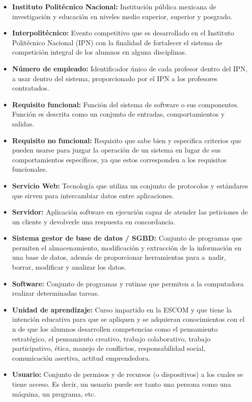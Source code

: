 \begin{itemize}
		\item \textbf{Instituto Politécnico Nacional:} Institución pública mexicana de investigación y educación en niveles medio superior, superior y posgrado. 
		\item \textbf{Interpolitécnico:} Evento competitivo que es desarrollado en el Instituto Politécnico Nacional (IPN) con la finalidad de fortalecer el sistema de competición integral de los alumnos en alguna disciplinas.
		\item \textbf{Número de empleado:} Identificador único de cada profesor dentro del IPN, a usar dentro del sistema, proporcionado por el IPN a los profesores contratados. 
		\item \textbf{Requisito funcional:} Función del sistema de software o sus componentes. Función es descrita como un conjunto de entradas, comportamientos y salidas. 
		\item \textbf{Requisito no funcional:} Requisito que sabe bien y especifica criterios que pueden usarse para juzgar la operación de un sistema en lugar de sus comportamientos específicos, ya que estos corresponden a los requisitos funcionales. 
		\item \textbf{Servicio Web:} Tecnología que utiliza un conjunto de protocolos y estándares que sirven para intercambiar datos entre aplicaciones.
		\item \textbf{Servidor:} Aplicación software en ejecución capaz de atender las peticiones de un cliente y devolverle una respuesta en concordancia.
		\item \textbf{Sistema gestor de base de datos / SGBD:} Conjunto de programas que permiten el almacenamiento, modificación y extracción de la información en una base de datos, además de proporcionar herramientas para a~nadir, borrar, modificar y analizar los datos.
		\item \textbf{Software:} Conjunto de programas y rutinas que permiten a la computadora realizar determinadas tareas.
		\item \textbf{Unidad de aprendizaje:} Curso impartido en la ESCOM y que tiene la intención educativa para que se apliquen y se adquieran conocimientos con el n de que los alumnos desarrollen competencias como el pensamiento estratégico, el pensamiento creativo, trabajo colaborativo, trabajo participativo, ética, manejo de conflictos, responsabilidad social, comunicación asertiva, actitud emprendedora.
		\item \textbf{Usuario:} Conjunto de permisos y de recursos (o dispositivos) a los cuales se tiene acceso. Es decir, un usuario puede ser tanto una persona como una máquina, un programa, etc.
	\end{itemize}

